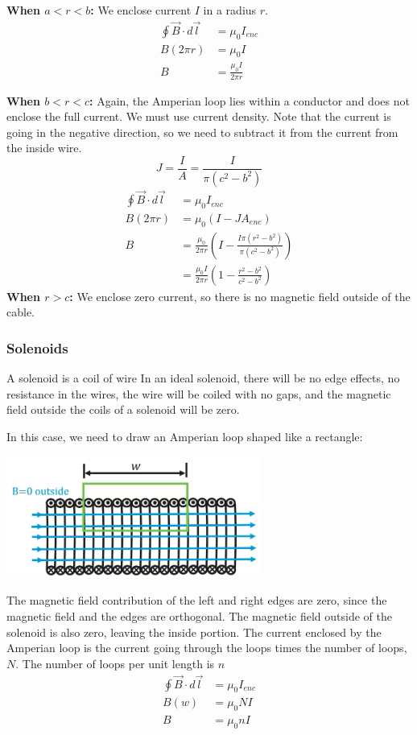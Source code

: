 \documentclass[12pt, titlepage]{article}
\begin{document}
\textbf{When $a<r<b$:} We enclose current $I$ in a radius $r$.
\begin{align*}
    \oint \vec{B} \cdot d\vec{l} &= \mu_0I_{enc} \\
    B(2\pi r) &= \mu_0 I \\
    B &= \boxed{\frac{\mu_0 I}{2\pi r}}
\end{align*}

\textbf{When $b<r<c$:} Again, the Amperian loop lies within a conductor and does not enclose the full current. We must use current density. Note that the current is going in the negative direction, so we need to subtract it from the current from the inside wire.
\begin{equation*}
    J=\frac{I}{A}=\frac{I}{\pi(c^2-b^2)}
\end{equation*}
\begin{align*}
    \oint \vec{B} \cdot d\vec{l} &= \mu_0I_{enc} \\
    B(2\pi r) &= \mu_0 (I-JA_{enc}) \\
    B &= \frac{\mu_0}{2 \pi r} (I- \frac{I\pi (r^2-b^2)}{\pi (c^2-b^2)}) \\
    &= \boxed{\frac{\mu_0I}{2 \pi r}(1-\frac{r^2-b^2}{c^2-b^2})}
\end{align*}
\textbf{When $r>c$:} We enclose zero current, so there is no magnetic field outside of the cable.

\subsubsection*{Solenoids}

A solenoid is a coil of wire In an ideal solenoid, there will be no edge effects, no resistance in the wires, the wire will be coiled with no gaps, and the magnetic field outside the coils of a solenoid will be zero. 

In this case, we need to draw an Amperian loop shaped like a rectangle:
\begin{center}
    \includegraphics*[height=4cm]{media/solenoid.png}
\end{center}
The magnetic field contribution of the left and right edges are zero, since the magnetic field and the edges are orthogonal. The magnetic field outside of the solenoid is also zero, leaving the inside portion. The current enclosed by the Amperian loop is the current going through the loops times the number of loops, $N$. The number of loops per unit length is $n$
\begin{align*}
    \oint \vec{B} \cdot d\vec{l} &= \mu_0I_{enc} \\
    B(w) &= \mu_0NI \\
    B &= \boxed{\mu_0nI}
\end{align*}
\end{document}
